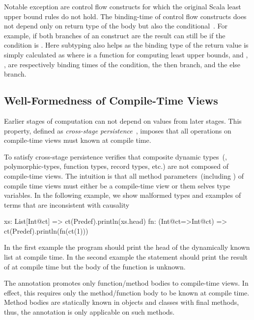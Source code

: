  Notable exception are control flow constructs for which the original Scala least
 upper bound rules do not hold. The binding-time of control flow constructs does not
 depend only on return type of the body but also the conditional~\cite{}. For example, if
 both branches of an  construct are  the result can still be 
 if the condition is . Here subtyping also helps as the binding type of the
 return value is simply calculated as  where  is a function
 for computing least upper bounds, and , ,  are respectively
 binding times of the condition, the then branch, and the else branch.

\subsection{Well-Formedness of Compile-Time Views}
\label{sct:wf-ctv}

Earlier stages of computation can not depend on values from later stages. This property,
 defined as \emph{cross-stage persistence}~\cite{taha_multi-stage_1997,westbrook2010mint},
 imposes that all operations on compile-time views must known at compile time.

To satisfy cross-stage persistence \tool verifies that composite dynamic
 types~(\eg, polymorphic-types, function types, record types, etc.) are not composed
 of compile-time views. The intuition is that all method parameters~(including )
 of compile time views must either be a compile-time view or them selves type variables. In the following example,
 we show malformed types and examples of terms that are inconsistent with causality\begin{lstparagraph}
xs: List[Int@ct]     => ct(Predef).println(xs.head)
fn: (Int@ct=>Int@ct) => ct(Predef).println(fn(ct(1)))
\end{lstparagraph}

In the first example the program should print the head of the dynamically known list
 at compile time. In the second example the statement should print the result of  at
 compile time but the body of the function is unknown.

The  annotation promotes only function/method bodies to compile-time views. In effect,
 this requires only the method/function body to be known at compile time. Method bodies
 are statically known in objects and classes with final methods, thus, the 
 annotation is only applicable on such methods.

